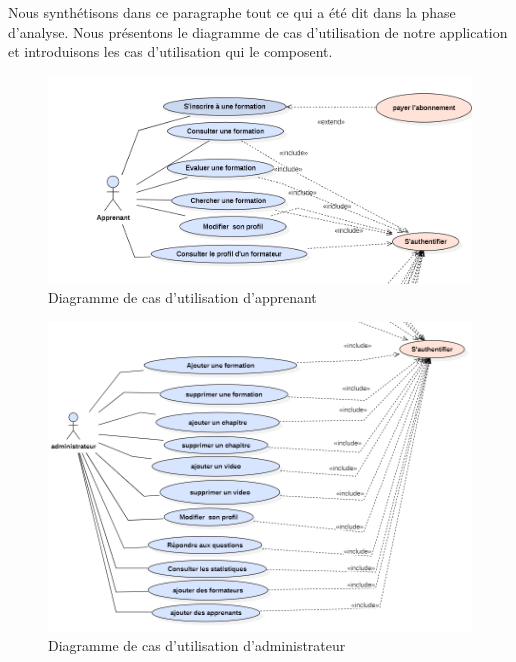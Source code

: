 Nous synthétisons dans ce paragraphe tout ce qui a été dit dans la phase
d’analyse. Nous présentons le diagramme de cas d’utilisation de notre application et
introduisons les cas d’utilisation qui le composent.

\begin{figure}[H] 
    \centering
    \includegraphics[width=15cm]{Figures/apprenant.PNG}
    \caption{ Diagramme de cas d’utilisation d'apprenant}
\end{figure}

\begin{figure}[H] 
    \centering
    \includegraphics[width=13cm]{Figures/administrateur.PNG}
    \caption{ Diagramme de cas d’utilisation d'administrateur}
\end{figure}


